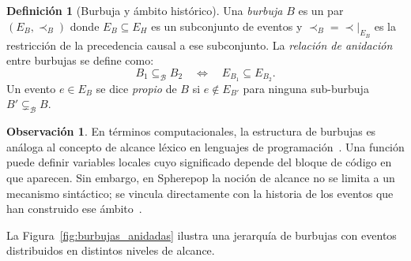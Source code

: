 \documentclass[12pt]{article}
\theoremstyle{plain}
\theoremstyle{definition}
\newtheorem{definition}[theorem]{Definición}
\newtheorem{remark}[theorem]{Observación}
\begin{document}
\begin{definition}[Burbuja y ámbito histórico]
\label{def:burbuja}
Una \emph{burbuja} $B$ es un par $(E_B, \prec_B)$ donde $E_B \subseteq E_H$ es un subconjunto de eventos y $\prec_B = \prec|_{E_B}$ es la restricción de la precedencia causal a ese subconjunto. La \emph{relación de anidación} entre burbujas se define como:
\[
B_1 \subseteq_{\mathcal{B}} B_2 \quad\Longleftrightarrow\quad E_{B_1} \subseteq E_{B_2}.
\]
Un evento $e \in E_B$ se dice \emph{propio} de $B$ si $e \notin E_{B'}$ para ninguna sub-burbuja $B' \subsetneq_{\mathcal{B}} B$.
\end{definition}

\begin{remark}
En términos computacionales, la estructura de burbujas es análoga al concepto de alcance léxico en lenguajes de programación~\cite{church,plotkin}. Una función puede definir variables locales cuyo significado depende del bloque de código en que aparecen. Sin embargo, en Spherepop la noción de alcance no se limita a un mecanismo sintáctico; se vincula directamente con la historia de los eventos que han construido ese ámbito~\cite{winskel}.
\end{remark}

La Figura~\ref{fig:burbujas_anidadas} ilustra una jerarquía de burbujas con eventos distribuidos en distintos niveles de alcance.
\end{document}
